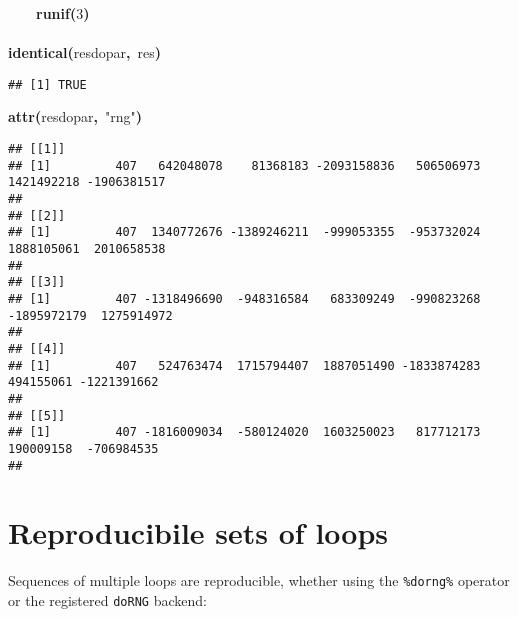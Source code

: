 \documentclass[a4paper,12pt]{article}\usepackage{graphicx, color}
\makeatletter
\newcommand{\hlnumber}[1]{\textcolor[rgb]{0,0,0}{#1}}%
\newcommand{\hlfunctioncall}[1]{\textcolor[rgb]{0.501960784313725,0,0.329411764705882}{\textbf{#1}}}%
\newcommand{\hlstring}[1]{\textcolor[rgb]{0.6,0.6,1}{#1}}%
\newcommand{\hlkeyword}[1]{\textcolor[rgb]{0,0,0}{\textbf{#1}}}%
\newcommand{\hlsymbol}[1]{\textcolor[rgb]{0,0,0}{#1}}%
\newcommand{\hlstd}[1]{\textcolor[rgb]{0,0,0}{#1}}%
\newenvironment{kframe}{%
 \def\FrameCommand##1{\hskip\@totalleftmargin \hskip-\fboxsep
 \colorbox{shadecolor}{##1}\hskip-\fboxsep
     \hskip-\linewidth \hskip-\@totalleftmargin \hskip\columnwidth}%
 \MakeFramed {\advance\hsize-\width
   \@totalleftmargin\z@ \linewidth\hsize
   \@setminipage}}%
 {\par\unskip\endMakeFramed}
\newenvironment{knitrout}{}{} %
\renewenvironment{knitrout}{\begin{footnotesize}}{\end{footnotesize}}
\let\code=\texttt
\makeatother
\begin{document}
\begin{knitrout}
\begin{kframe}
\begin{flushleft}
\hlstd{}{\ }{\ }{\ }{\ }\hlfunctioncall{runif}\hlkeyword{(}\hlnumber{3}\hlkeyword{)}\hspace*{\fill}\\
\hlstd{}\hlkeyword{\usebox{\hlnormalsizeboxclosebrace}}\hspace*{\fill}\\
\hlstd{}\hlfunctioncall{identical}\hlkeyword{(}\hlsymbol{res\usebox{\hlnormalsizeboxunderscore}dopar}\hlkeyword{,}{\ }\hlsymbol{res}\hlkeyword{)}\mbox{}
\normalfont
\end{flushleft}
\begin{verbatim}
## [1] TRUE
\end{verbatim}
\begin{flushleft}
\ttfamily\noindent
\hlfunctioncall{attr}\hlkeyword{(}\hlsymbol{res\usebox{\hlnormalsizeboxunderscore}dopar}\hlkeyword{,}{\ }\hlstring{"{}rng"{}}\hlkeyword{)}\mbox{}
\normalfont
\end{flushleft}
\begin{verbatim}
## [[1]]
## [1]         407   642048078    81368183 -2093158836   506506973  1421492218 -1906381517
## 
## [[2]]
## [1]         407  1340772676 -1389246211  -999053355  -953732024  1888105061  2010658538
## 
## [[3]]
## [1]         407 -1318496690  -948316584   683309249  -990823268 -1895972179  1275914972
## 
## [[4]]
## [1]         407   524763474  1715794407  1887051490 -1833874283   494155061 -1221391662
## 
## [[5]]
## [1]         407 -1816009034  -580124020  1603250023   817712173   190009158  -706984535
## 
\end{verbatim}
\end{kframe}
\end{knitrout}


\section{Reproducibile sets of loops}

Sequences of multiple loops are reproducible, whether using the
\code{\%dorng\%} operator or the registered \code{doRNG} backend:
\end{document}
